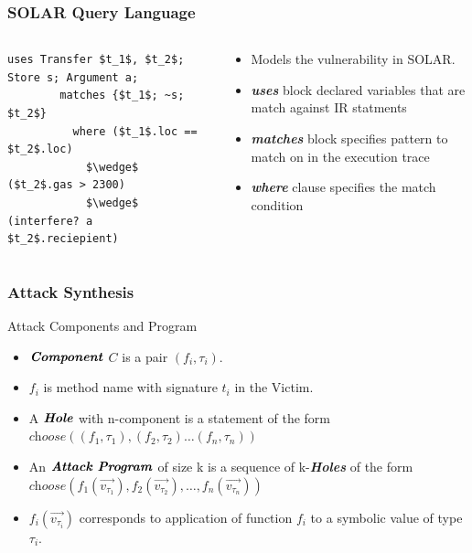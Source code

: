 \documentclass{beamer}
\newcommand{\hole}{\textit{choose}}
\newcommand{\boldIt}[1]{\textbf{\textit{#1}}}
\newcommand{\vect}[1]{\overrightarrow{#1}}
\begin{document}
\begin{frame}[fragile]
  \frametitle{SOLAR Query Language}
  \begin{columns}[T]
    \begin{column}{0.5\textwidth}
      \begin{lstlisting}[language=Solar, numbers=none]
        uses Transfer $t_1$, $t_2$; Store s; Argument a;
        matches {$t_1$; ~s; $t_2$}
          where ($t_1$.loc == $t_2$.loc)
            $\wedge$ ($t_2$.gas > 2300)
            $\wedge$ (interfere? a $t_2$.reciepient)
      \end{lstlisting}
    \end{column}
    \begin{column}{0.5\textwidth}
      \begin{itemize}
      \item Models the vulnerability in SOLAR.
      \item \textit{\textbf{uses}} block declared variables
        that are match against IR statments
      \item \textit{\textbf{matches}} block specifies pattern
        to match on in the execution trace
      \item \textit{\textbf{where}} clause specifies the match
        condition
      \end{itemize}
    \end{column}
  \end{columns}
\end{frame}

\begin{frame}[fragile]
  \frametitle{Attack Synthesis}
  \begin{block}{Attack Components and Program}
    \begin{itemize}
      \item $\boldIt{Component}$ $C$ is a pair $(f_i, \tau_i)$.
      \item $f_i$ is method name with signature $t_i$ in the Victim.
      \item A $\boldIt{Hole}$ with n-component is a statement of the form
        $\hole((f_1, \tau_1), (f_2, \tau_2) \dots (f_n, \tau_n))$
      \item An $\boldIt{Attack Program}$ of size k is a sequence of
        k-\boldIt{Holes} of the form $\hole(f_1(\vect{v_{\tau_1}}),
        f_2(\vect{v_{\tau_2}}), \dots, f_n(\vect{v_{\tau_n}}))$
      \item $f_i(\vect{v_{\tau_i}})$ corresponds to application of
        function $f_i$ to a symbolic value of type $\tau_i$.
    \end{itemize}
  \end{block}
\end{frame}
\end{document}

